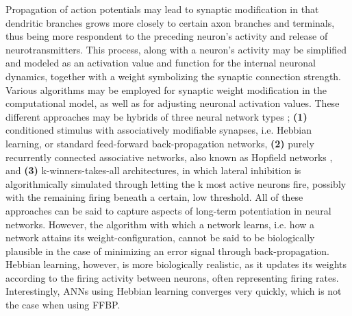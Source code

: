 
Propagation of action potentials may lead to synaptic modification in that dendritic branches grows more closely to certain axon branches and terminals, thus being more respondent to the preceding neuron's activity and release of neurotransmitters. This process, along with a neuron's activity may be simplified and modeled as an activation value and function for the internal neuronal dynamics, together with a weight symbolizing the synaptic connection strength. Various algorithms may be employed for synaptic weight modification in the computational model, as well as for adjusting neuronal activation values. These different approaches may be hybrids of three neural network types \citep{Rolls1998chpt1}; \textbf{(1)} conditioned stimulus with associatively modifiable synapses, i.e. Hebbian learning, or standard feed-forward back-propagation networks, \textbf{(2)} purely recurrently connected associative networks, also known as Hopfield networks \citep{Hopfield1982}, and \textbf{(3)} k-winners-takes-all architectures, in which lateral inhibition is algorithmically simulated through letting the k most active neurons fire, possibly with the remaining firing beneath a certain, low threshold. All of these approaches can be said to capture aspects of long-term potentiation in neural networks. However, the algorithm with which a network learns, i.e. how a network attains its weight-configuration, cannot be said to be biologically plausible in the case of minimizing an error signal through back-propagation. Hebbian learning, however, is more biologically realistic, as it updates its weights according to the firing activity between neurons, often representing firing rates. Interestingly, ANNs using Hebbian learning converges very quickly, which is not the case when using FFBP.

